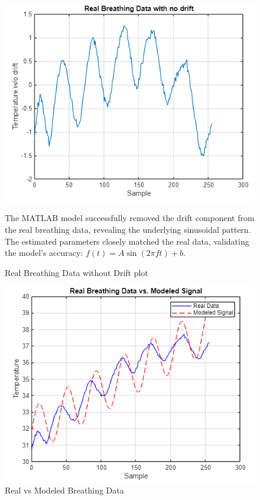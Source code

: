 \documentclass[journal]{IEEEtran}
\begin{document}
\begin{figure}[H]
    \centering
    \includegraphics[width=\linewidth]{1.2.png}
    \caption{Real Breathing Data without Drift plot}
    \vspace{1em} %
    \begin{minipage}{\linewidth}
        The MATLAB model successfully removed the drift component from the real breathing data, revealing the underlying sinusoidal pattern. The estimated parameters closely matched the real data, validating the model's accuracy: \( f(t) = A \sin(2\pi ft) + b \).
    \end{minipage}
    \label{fig:part1_noDrift}
\end{figure}

\begin{figure}[H]
    \centering
    \includegraphics[width=\linewidth]{1.3.png}
    \caption{Real vs Modeled Breathing Data}
    \vspace{1em} %
    \label{fig:part1_Comparison}
\end{figure}
\end{document}
